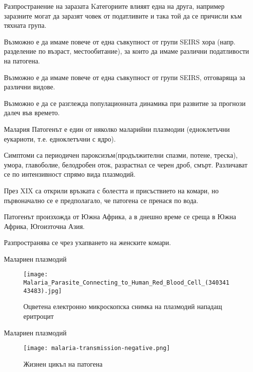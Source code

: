 \begin{frame}[t]{Разпространение на заразата}
  Kатегориите влияят една на друга, например заразните могат да заразят човек от податливите и така той да се причисли към тяхната група.

  Възможно е да имаме повече от една съвкупност от групи SEIRS хора (напр. разделение по възраст, местообитание), за които да имаме различни податливости на патогена.

  Възможно е да имаме повече от една съвкупност от групи SEIRS, отговаряща за различни видове.

  Възможно е да се разглежда популационната динамика при развитие за прогнози далеч във времето.
\end{frame}

\begin{frame}[t]{Малария}
  Патогенът е един от няколко маларийни плазмодии (едноклетъчни еукариоти, т.е. едноклетъчни с ядро).

  Симптоми са периодичен пароксизъм(продължителни спазми, потене, треска), умора, главоболие, белодробен оток, разрастнал се черен дроб, смърт. Различават се по интензивност спрямо вида плазмодий.

  През XIX са открили връзката с болестта и присъствието на комари, но първоначално се е предполагало, че патогена се пренася по вода.

  Патогенът произхожда от Южна Африка, а в днешно
  време се среща в Южна Африка, Югоизточна Азия.
  
  Разпространява се чрез ухапването на женските комари.
\end{frame}

\begin{frame}[t]{Малариен плазмодий}
  \begin{figure}
    \texttt{[image: Malaria\_Parasite\_Connecting\_to\_Human\_Red\_Blood\_Cell\_(34034143483).jpg]}
    \centering
    \caption{Оцветена електронно микроскопска снимка на плазмодий нападащ еритроцит}
  \end{figure}
\end{frame}

\begin{frame}[t]{Малариен плазмодий}
  \begin{figure}
    \texttt{[image: malaria-transmission-negative.png]}
    \centering
    \caption{Жизнен цикъл на патогена}
  \end{figure}
\end{frame}
